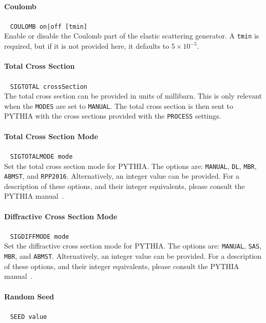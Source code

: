 \paragraph{Coulomb}~ \texttt{COULOMB on|off [tmin]}\\

Enable or disable the Coulomb part of the elastic scattering generator.
A \texttt{tmin} is required, but if it is not provided here, it defaults to $5\times 10^{-5}$.

\paragraph{Total Cross Section}~ \texttt{SIGTOTAL crossSection}\\

The total cross section can be provided in units of millibarn.
This is only relevant when the \texttt{MODES} are set to \texttt{MANUAL}.
The total cross section is then sent to PYTHIA with the cross sections provided with the \texttt{PROCESS} settings.

\paragraph{Total Cross Section Mode}~ \texttt{SIGTOTALMODE mode}\\

Set the total cross section mode for PYTHIA.
The options are: \texttt{MANUAL}, \texttt{DL}, \texttt{MBR}, \texttt{ABMST}, and \texttt{RPP2016}.
Alternatively, an integer value can be provided.
For a description of these options, and their integer equivalents, please consult the PYTHIA manual~\cite{pythia8}.

\paragraph{Diffractive Cross Section Mode}~ \texttt{SIGDIFFMODE mode}\\

Set the diffractive cross section mode for PYTHIA.
The options are: \texttt{MANUAL}, \texttt{SAS}, \texttt{MBR}, and \texttt{ABMST}.
Alternatively, an integer value can be provided.
For a description of these options, and their integer equivalents, please consult the PYTHIA manual~\cite{pythia8}.

\paragraph{Random Seed}~ \texttt{SEED value}\\

